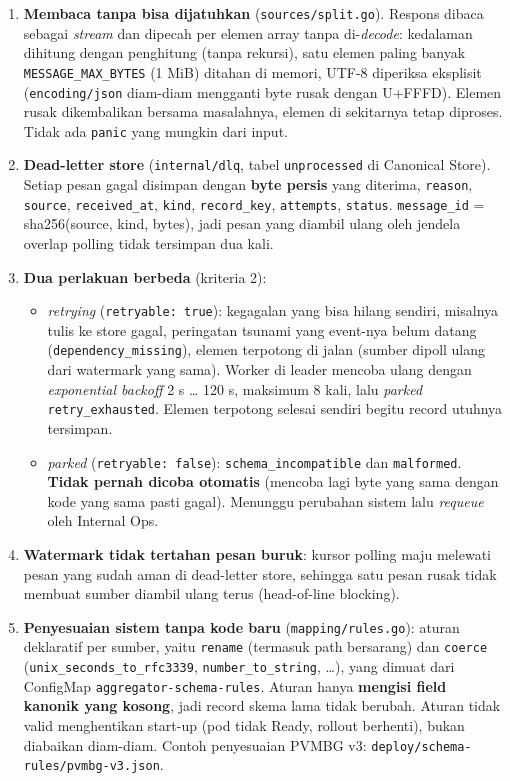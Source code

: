 \begin{enumerate}
\item \textbf{Membaca tanpa bisa dijatuhkan} (\texttt{sources/\allowbreak{}split.\allowbreak{}go}). Respons dibaca sebagai \emph{stream} dan dipecah per elemen array tanpa di-\emph{decode}: kedalaman dihitung dengan penghitung (tanpa rekursi), satu elemen paling banyak \texttt{MESSAGE\_\allowbreak{}MAX\_\allowbreak{}BYTES} (1 MiB) ditahan di memori, UTF-8 diperiksa eksplisit (\texttt{encoding/\allowbreak{}json} diam-diam mengganti byte rusak dengan U+FFFD). Elemen rusak dikembalikan bersama masalahnya, elemen di sekitarnya tetap diproses. Tidak ada \texttt{panic} yang mungkin dari input.
\item \textbf{Dead-letter store} (\texttt{internal/\allowbreak{}dlq}, tabel \texttt{unprocessed} di Canonical Store). Setiap pesan gagal disimpan dengan \textbf{byte persis} yang diterima, \texttt{reason}, \texttt{source}, \texttt{received\_\allowbreak{}at}, \texttt{kind}, \texttt{record\_\allowbreak{}key}, \texttt{attempts}, \texttt{status}. \texttt{message\_\allowbreak{}id} = sha256(source, kind, bytes), jadi pesan yang diambil ulang oleh jendela overlap polling tidak tersimpan dua kali.
\item \textbf{Dua perlakuan berbeda} (kriteria 2):
\begin{itemize}
\item \emph{retrying} (\texttt{retryable: true}): kegagalan yang bisa hilang sendiri, misalnya tulis ke store gagal, peringatan tsunami yang event-nya belum datang (\texttt{dependency\_\allowbreak{}missing}), elemen terpotong di jalan (sumber dipoll ulang dari watermark yang sama). Worker di leader mencoba ulang dengan \emph{exponential backoff} 2 s \ldots{} 120 s, maksimum 8 kali, lalu \emph{parked} \texttt{retry\_\allowbreak{}exhausted}. Elemen terpotong selesai sendiri begitu record utuhnya tersimpan.
\item \emph{parked} (\texttt{retryable: false}): \texttt{schema\_\allowbreak{}incompatible} dan \texttt{malformed}. \textbf{Tidak pernah dicoba otomatis} (mencoba lagi byte yang sama dengan kode yang sama pasti gagal). Menunggu perubahan sistem lalu \emph{requeue} oleh Internal Ops.
\end{itemize}
\item \textbf{Watermark tidak tertahan pesan buruk}: kursor polling maju melewati pesan yang sudah aman di dead-letter store, sehingga satu pesan rusak tidak membuat sumber diambil ulang terus (head-of-line blocking).
\item \textbf{Penyesuaian sistem tanpa kode baru} (\texttt{mapping/\allowbreak{}rules.\allowbreak{}go}): aturan deklaratif per sumber, yaitu \texttt{rename} (termasuk path bersarang) dan \texttt{coerce} (\texttt{unix\_\allowbreak{}seconds\_\allowbreak{}to\_\allowbreak{}rfc3339}, \texttt{number\_\allowbreak{}to\_\allowbreak{}string}, \ldots{}), yang dimuat dari ConfigMap \texttt{aggregator-\allowbreak{}schema-\allowbreak{}rules}. Aturan hanya \textbf{mengisi field kanonik yang kosong}, jadi record skema lama tidak berubah. Aturan tidak valid menghentikan start-up (pod tidak Ready, rollout berhenti), bukan diabaikan diam-diam. Contoh penyesuaian PVMBG v3: \texttt{deploy/\allowbreak{}schema-\allowbreak{}rules/\allowbreak{}pvmbg-\allowbreak{}v3.\allowbreak{}json}.

\end{enumerate}
